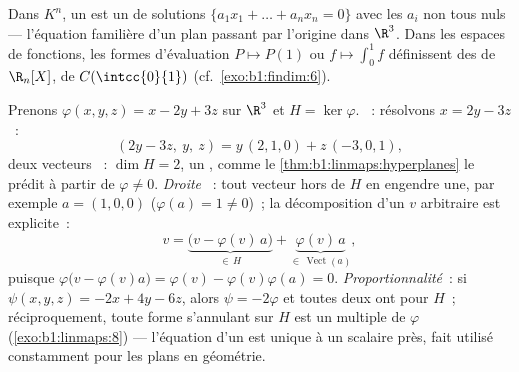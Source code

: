 \begin{example}\label{ex:b1:linmaps:hyperplane}
Dans $K^n$, un  est un  de solutions $\{a_1 x_1 + \dots + a_n
x_n = 0\}$ avec les $a_i$ non tous nuls --- l'équation familière d'un
plan passant par l'origine dans $\R^3$. Dans les espaces de fonctions, les formes
d'évaluation $P \mapsto P(1)$ ou $f \mapsto \int_0^1 f$ définissent des 
de $\R_n[X]$, de $C(\intcc{0}{1})$ (cf.\ \cref{exo:b1:findim:6}).
\end{example}

\begin{example}
\label{ex:b1:linmaps:hyperplanerun}
Prenons $\varphi(x, y, z) = x - 2y + 3z$ sur $\R^3$ et $H =
\ker\varphi$. \emph{}~: résolvons $x = 2y - 3z$~:
\[
(2y - 3z,\ y,\ z) = y\,(2, 1, 0) + z\,(-3, 0, 1),
\]
deux vecteurs ~: $\dim H = 2$, un , comme le
\cref{thm:b1:linmaps:hyperplanes} le prédit à partir de $\varphi \neq
0$. \emph{Droite }~: tout vecteur hors de $H$ en engendre une,
par exemple $a = (1, 0, 0)$ ($\varphi(a) = 1 \neq 0$)~; la
décomposition d'un $v$ arbitraire est explicite~:
\[
v = \underbrace{\bigl(v - \varphi(v)\,a\bigr)}_{\in\,H}
+ \underbrace{\varphi(v)\,a}_{\in\,\operatorname{Vect}(a)},
\]
puisque $\varphi\bigl(v - \varphi(v)a\bigr) = \varphi(v) -
\varphi(v)\varphi(a) = 0$. \emph{Proportionnalité}~: si $\psi(x,y,z)
= -2x + 4y - 6z$, alors $\psi = -2\varphi$ et toutes deux ont pour 
$H$~; réciproquement, toute forme s'annulant sur $H$ est un multiple de
$\varphi$ (\cref{exo:b1:linmaps:8}) --- l'équation d'un
 est unique à un scalaire près, fait utilisé constamment pour les
plans en géométrie.
\end{example}


